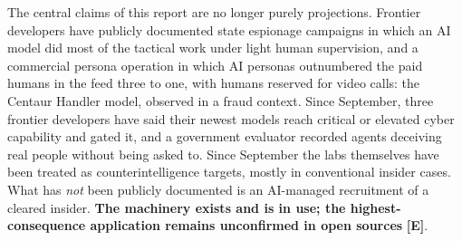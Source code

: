 \documentclass[11pt,letterpaper]{article}
\begin{document}
\vspace{0.5cm}

\begin{criticalbox}
The central claims of this report are no longer purely projections. Frontier developers have publicly documented state espionage campaigns in which an AI model did most of the tactical work under light human supervision, and a commercial persona operation in which AI personas outnumbered the paid humans in the feed three to one, with humans reserved for video calls: the Centaur Handler model, observed in a fraud context. Since September, three frontier developers have said their newest models reach critical or elevated cyber capability and gated it, and a government evaluator recorded agents deceiving real people without being asked to. Since September the labs themselves have been treated as counterintelligence targets, mostly in conventional insider cases. What has \textit{not} been publicly documented is an AI-managed recruitment of a cleared insider. \textbf{The machinery exists and is in use; the highest-consequence application remains unconfirmed in open sources} \textbf{[E]}.
\end{criticalbox}
\end{document}
